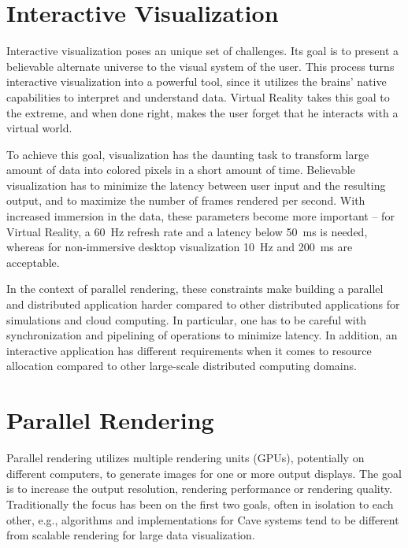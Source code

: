 \section{Interactive Visualization}

Interactive visualization poses an unique set of challenges. Its goal is to
present a believable alternate universe to the visual system of the user. This
process turns interactive visualization into a powerful tool, since it utilizes
the brains' native capabilities to interpret and understand data. Virtual
Reality takes this goal to the extreme, and when done right, makes the user
forget that he interacts with a virtual world.

To achieve this goal, visualization has the daunting task to transform large
amount of data into colored pixels in a short amount of time. Believable
visualization has to minimize the latency between user input and the resulting
output, and to maximize the number of frames rendered per second. With
increased immersion in the data, these parameters become more important --
for Virtual Reality, a 60~Hz refresh rate and a latency below 50~ms is needed,
whereas for non-immersive desktop visualization 10~Hz and 200~ms are acceptable.

In the context of parallel rendering, these constraints make building a
parallel and distributed application harder compared to other distributed
applications for simulations and cloud computing. In particular, one has to be
careful with synchronization and pipelining of operations to minimize latency.
In addition, an interactive application has different requirements when it
comes to resource allocation compared to other large-scale distributed
computing domains.

\section{Parallel Rendering}

Parallel rendering utilizes multiple rendering units (GPUs), potentially on
different computers, to generate images for one or more output displays. The
goal is to increase the output resolution, rendering performance or rendering
quality. Traditionally the focus has been on the first two goals, often in
isolation to each other, e.g., algorithms and implementations for Cave systems
tend to be different from scalable rendering for large data visualization.

